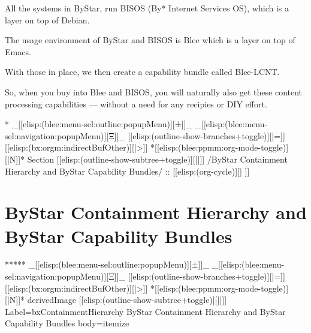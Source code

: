 \begin{whenOrg}
\begin{verblatex}
\begin{frame}[fragile,plain,label=lcntCapability]
{  All the systems in ByStar, run BISOS (By* Internet Services OS), which is a layer on top of Debian.

  The usage environment of ByStar and BISOS is Blee which is a layer on top of Emacs.

  With those in place, we then create a capability bundle called Blee-LCNT.

  So, when you buy into Blee and BISOS, you will naturally also get these content processing
  capabilities --- without a need for any recipies or DIY effort.

}

\end{frame}
\end{verblatex}



\begin{whenOrg}
*  _[[elisp:(blee:menu-sel:outline:popupMenu)][±]]_ _[[elisp:(blee:menu-sel:navigation:popupMenu)][Ξ]]_ [[elisp:(outline-show-branches+toggle)][|=]] [[elisp:(bx:orgm:indirectBufOther)][|>]] *[[elisp:(blee:ppmm:org-mode-toggle)][|N]]*  Section    [[elisp:(outline-show-subtree+toggle)][||]]   /ByStar Containment Hierarchy and ByStar Capability Bundles/ ::  [[elisp:(org-cycle)][| ]]
\end{whenOrg}

\section{ByStar Containment Hierarchy and ByStar Capability Bundles}

\begin{whenOrg}
*****  _[[elisp:(blee:menu-sel:outline:popupMenu)][±]]_ _[[elisp:(blee:menu-sel:navigation:popupMenu)][Ξ]]_ [[elisp:(outline-show-branches+toggle)][|=]] [[elisp:(bx:orgm:indirectBufOther)][|>]] *[[elisp:(blee:ppmm:org-mode-toggle)][|N]]*  derivedImage [[elisp:(outline-show-subtree+toggle)][||]] Label=bxContainmentHierarchy ByStar Containment Hierarchy and ByStar Capability Bundles body=itemize
\end{whenOrg}


\end{whenOrg}
